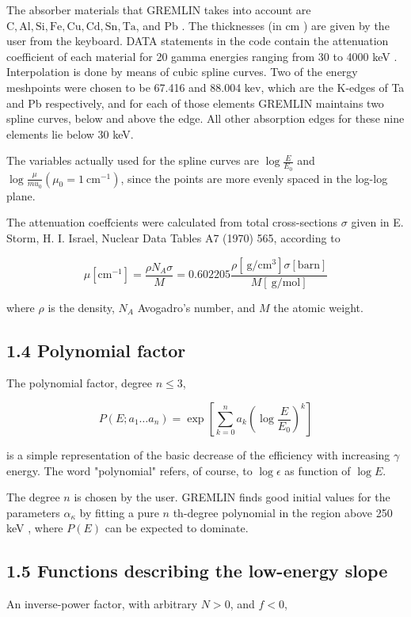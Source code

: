 \documentclass[10pt]{article}
\begin{document}
The absorber materials that GREMLIN takes into account are $\mathrm{C}, \mathrm{Al}, \mathrm{Si}, \mathrm{Fe}, \mathrm{Cu}, \mathrm{Cd}, \mathrm{Sn}, \mathrm{Ta}$, and Pb . The thicknesses (in cm ) are given by the user from the keyboard. DATA statements in the code contain the attenuation coefficient of each material for 20 gamma energies ranging from 30 to 4000 keV . Interpolation is done by means of cubic spline curves. Two of the energy meshpoints were chosen to be 67.416 and 88.004 kev, which are the K-edges of Ta and Pb respectively, and for each of those elements GREMLIN maintains two spline curves, below and above the edge. All other absorption edges for these nine elements lie below 30 keV.

The variables actually used for the spline curves are $\log \frac{E}{E_{0}}$ and $\log \frac{\mu}{m u_{0}}\left(\mu_{0}=1 \mathrm{~cm}^{-1}\right)$, since the points are more evenly spaced in the log-log plane.

The attenuation coeffcients were calculated from total cross-sections $\sigma$ given in E. Storm, H. I. Israel, Nuclear Data Tables A7 (1970) 565, according to

$$
\mu\left[\mathrm{cm}^{-1}\right]=\frac{\rho N_{A} \sigma}{M}=0.602205 \frac{\rho\left[\mathrm{~g} / \mathrm{cm}^{3}\right] \sigma[\mathrm{barn}]}{M[\mathrm{~g} / \mathrm{mol}]}
$$

where $\rho$ is the density, $N_{A}$ Avogadro's number, and $M$ the atomic weight.

\subsection*{1.4 Polynomial factor}
The polynomial factor, degree $n \leq 3$,

$$
P\left(E ; a_{1} \ldots a_{n}\right)=\exp \left[\sum_{k=0}^{n} a_{k}\left(\log \frac{E}{E_{0}}\right)^{k}\right]
$$

is a simple representation of the basic decrease of the efficiency with increasing $\gamma$ energy. The word "polynomial" refers, of course, to $\log \epsilon$ as function of $\log E$.

The degree $n$ is chosen by the user. GREMLIN finds good initial values for the parameters $\alpha_{\kappa}$ by fitting a pure $n$ th-degree polynomial in the region above 250 keV , where $P(E)$ can be expected to dominate.

\subsection*{1.5 Functions describing the low-energy slope}
An inverse-power factor, with arbitrary $N>0$, and $f<0$,
\end{document}
